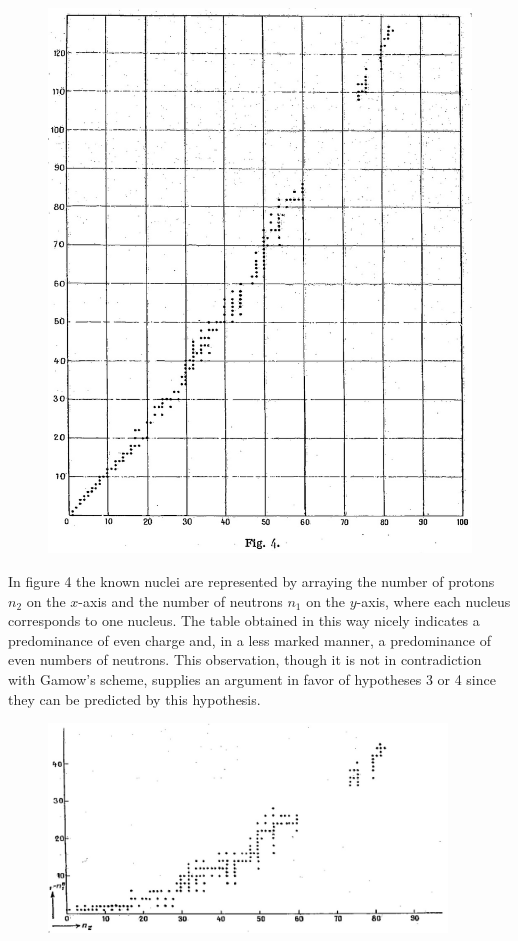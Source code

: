 \documentclass[a4paper,11pt]{article}
\newcommand{\?}[2]{#1\footnote{\textsc{Translator note}: #2}}
\begin{document}
{{\begin{figure}[h!]
\centering
\includegraphics[width=350pt]{images/fig4}
\end{figure}
In figure 4 the known nuclei are represented by arraying the number of protons $n_2$ on the $x$-axis and the number of neutrons $n_1$ on the $y$-axis, where each nucleus corresponds to one nucleus. The table obtained in this way nicely indicates a predominance of even charge and, in a less marked manner, a predominance of even numbers of neutrons. This observation, though it is not in contradiction with Gamow's scheme, supplies an argument in favor of hypotheses 3 or 4 since they can be predicted by this hypothesis.

\begin{figure}[h!]
\centering
\includegraphics[width=300pt]{images/Fig5}
\end{figure}

}}
\end{document}
